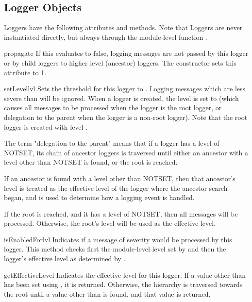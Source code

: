 \subsection{Logger Objects}

Loggers have the following attributes and methods. Note that Loggers are
never instantiated directly, but always through the module-level function
.

\begin{datadesc}{propagate}
If this evaluates to false, logging messages are not passed by this
logger or by child loggers to higher level (ancestor) loggers. The
constructor sets this attribute to 1.
\end{datadesc}

\begin{methoddesc}{setLevel}{lvl}
Sets the threshold for this logger to . Logging messages
which are less severe than  will be ignored. When a logger is
created, the level is set to  (which causes all messages
to be processed when the logger is the root logger, or delegation to the
parent when the logger is a non-root logger). Note that the root logger
is created with level .

The term "delegation to the parent" means that if a logger has a level
of NOTSET, its chain of ancestor loggers is traversed until either an
ancestor with a level other than NOTSET is found, or the root is
reached.

If an ancestor is found with a level other than NOTSET, then that
ancestor's level is treated as the effective level of the logger where
the ancestor search began, and is used to determine how a logging
event is handled.

If the root is reached, and it has a level of NOTSET, then all
messages will be processed. Otherwise, the root's level will be used
as the effective level.
\end{methoddesc}

\begin{methoddesc}{isEnabledFor}{lvl}
Indicates if a message of severity  would be processed by
this logger.  This method checks first the module-level level set by
 and then the logger's effective level as
determined by .
\end{methoddesc}

\begin{methoddesc}{getEffectiveLevel}{}
Indicates the effective level for this logger. If a value other than
 has been set using , it is returned.
Otherwise, the hierarchy is traversed towards the root until a value
other than  is found, and that value is returned.
\end{methoddesc}

